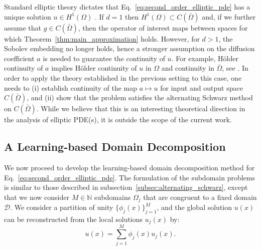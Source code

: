 \documentclass[preprint,11pt]{elsarticle}
\theoremstyle{plain}
\newcommand{\N}{\mathbb{N}}
\begin{document}
Standard elliptic theory dictates that Eq.~\eqref{eq:second_order_elliptic_pde} has a unique solution $u \in H^{1}(\Omega)$ \cite{gilbarg2001elliptic}. If $d = 1$ then $H^1 (\Omega) \subset C(\bar{\Omega})$ and, if we further assume that $g \in C(\bar{\Omega})$, then the operator of interest maps between spaces for which Theorem~\ref{thm:main_approximation} holds. However, for $d > 1$, the Sobolev embedding no longer holds, hence a stronger assumption on the diffusion coefficient $a$ is needed to guarantee the continuity of $u$. For example, H{\"o}lder continuity of $a$ implies H{\"o}lder continuity of $u$ in $\Omega$ and continuity in $\bar{\Omega}$, see \cite[Chapter 6]{gilbarg2001elliptic}. In order to apply the theory established in the previous setting to this case, one needs to (i) establish continuity of the map $a \mapsto u$ for input and output space $C(\bar{\Omega})$, and (ii) show that the problem satisfies the alternating Schwarz method on $C(\bar{\Omega})$. While we believe that this is an interesting theoretical direction in the analysis of elliptic PDE(s), it is outside the scope of the current work.

\subsection{A Learning-based Domain Decomposition}
We now proceed to develop the learning-based domain decomposition method for Eq.~\eqref{eq:second_order_elliptic_pde}. The formulation of the subdomain problems is similar to those described in subsection~\ref{subsec:alternating_schwarz}, except that we now consider $M \in \N$ subdomains $\Omega_j$ that are congruent to a fixed domain $\mathcal{D}$. We consider a partition of unity $\{\phi_j(x)\}_{j=1}^M$, and the global solution $u(x)$ can be reconstructed from the local solutions $u_j(x)$ by:
\begin{equation}
u(x) = \sum_{j=1}^M \phi_j(x) u_j(x).
\end{equation}
\end{document}
